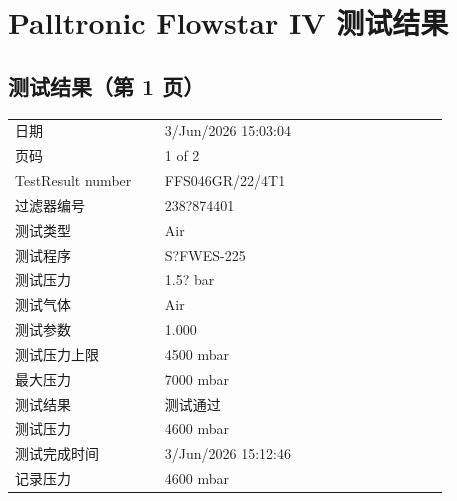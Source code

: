 \documentclass[UTF8,10pt,a4paper,fontset=fandol]{ctexart}
\newcommand{\fieldvalue}[1]{#1}
\begin{document}

\newpage

\section*{Palltronic Flowstar IV 测试结果}

\subsection*{测试结果（第 1 页）}

\begin{tabular}{@{}p{0.30\linewidth}p{0.58\linewidth}@{}}
日期 &
\fieldvalue{3/Jun/2026 15:03:04}
\\
页码 &
\fieldvalue{1 of 2}
\\
TestResult number &
\fieldvalue{FFS046GR/22/4T1}
\\
过滤器编号 &
\fieldvalue{238?874401}
\\
测试类型 &
\fieldvalue{Air}
\\
测试程序 &
\fieldvalue{S?FWES-225}
\\
测试压力 &
\fieldvalue{1.5? bar}
\\
测试气体 &
\fieldvalue{Air}
\\
测试参数 &
\fieldvalue{1.000}
\\
测试压力上限 &
\fieldvalue{4500 mbar}
\\
最大压力 &
\fieldvalue{7000 mbar}
\\
测试结果 &
\fieldvalue{测试通过}
\\
测试压力 &
\fieldvalue{4600 mbar}
\\
测试完成时间 &
\fieldvalue{3/Jun/2026 15:12:46}
\\
记录压力 &
\fieldvalue{4600 mbar}
\end{tabular}
\end{document}
